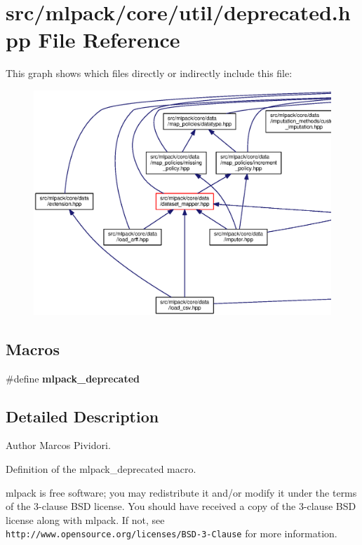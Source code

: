 \section{src/mlpack/core/util/deprecated.hpp File Reference}
\label{deprecated_8hpp}
This graph shows which files directly or indirectly include this file\+:
\nopagebreak
\begin{figure}[H]
\begin{center}
\leavevmode
\includegraphics[width=350pt]{deprecated_8hpp__dep__incl}
\end{center}
\end{figure}
\subsection*{Macros}
\begin{DoxyCompactItemize}
\item 
\#define {\bf mlpack\+\_\+deprecated}
\end{DoxyCompactItemize}


\subsection{Detailed Description}
\begin{DoxyAuthor}{Author}
Marcos Pividori.
\end{DoxyAuthor}
Definition of the mlpack\+\_\+deprecated macro.

mlpack is free software; you may redistribute it and/or modify it under the terms of the 3-\/clause B\+SD license. You should have received a copy of the 3-\/clause B\+SD license along with mlpack. If not, see {\tt http\+://www.\+opensource.\+org/licenses/\+B\+S\+D-\/3-\/\+Clause} for more information. 

